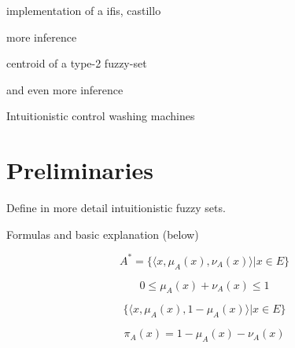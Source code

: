 \documentclass[conference]{IEEEtran}
\begin{document}
implementation of a ifis, castillo \cite{castillo2007intuitionistic}

more inference \cite{bustince1995method}

centroid of a type-2 fuzzy-set \cite{karnik2001centroid} %

and even more inference \cite{marinov2005method}

Intuitionistic control washing machines \cite{akram2014intuitionistic}

\section{Preliminaries}
\label{preliminaries}

Define in more detail intuitionistic fuzzy sets. 

Formulas and basic explanation (below) \cite{atanassov2013intuitionistic}

\begin{equation}
  A^{*} = \{\langle x, \mu _{A} (x), \nu _{A} (x) \rangle | x \in E\}
\end{equation}

\begin{equation}
  \label{intuitionistic-interval}
  0 \leq \mu_{A}(x) + \nu_{A}(x) \leq 1
\end{equation}

\begin{equation}
  \label{ifs-form}
  \{ \langle x, \mu_{A}(x), 1 - \mu_{A}(x) \rangle | x \in E \}
\end{equation}

\begin{equation}
  \label{fs-as-ifs-if}
  \pi_{A}(x) = 1 - \mu_{A}(x) - \nu_{A}(x)
\end{equation}
\end{document}
